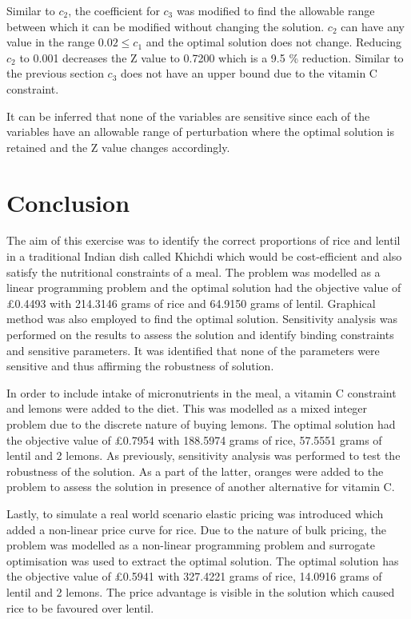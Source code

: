 \documentclass[
]{article}
\begin{document}
\begin{enumerate}
	      Similar to $c_2$, the coefficient for $c_3$ was modified to find the allowable range between which it can be modified without changing the solution.
	      $c_2$ can have any value in the range \(0.02 \le c_1 \) and the optimal solution does not change. Reducing $c_2$ to 0.001 decreases the Z value to 0.7200 which is a 9.5 \% reduction.
	      Similar to the previous section $c_3$ does not have an upper bound due to the vitamin C constraint.
	      	      
	      It can be inferred that none of the variables are sensitive since each of the variables have an allowable range of perturbation where the optimal solution is retained and the Z value changes accordingly.
	      	        
\end{enumerate}


\hypertarget{conclusion}{%
	\section{Conclusion}\label{conclusion}}

The aim of this exercise was to identify the correct proportions of rice and lentil in a traditional Indian dish called Khichdi which would be cost-efficient and also satisfy the nutritional constraints of a meal.
The problem was modelled as a linear programming problem and the optimal solution had the objective value of \pounds 0.4493 with 214.3146 grams of rice and 64.9150 grams of lentil.
Graphical method was also employed to find the optimal solution. Sensitivity analysis was performed on the results to assess the solution and identify binding constraints and sensitive parameters. It was identified that none of the parameters were sensitive and thus affirming the robustness of solution.

In order to include intake of micronutrients in the meal, a vitamin C constraint and lemons were added to the diet. This was modelled as a mixed integer problem due to the discrete nature of buying lemons.
The optimal solution had the objective value of \pounds 0.7954 with 188.5974 grams of rice, 57.5551 grams of lentil and 2 lemons. As previously, sensitivity analysis was performed to test the robustness of the solution.
As a part of the latter, oranges were added to the problem to assess the solution in presence of another alternative for vitamin C. 

Lastly, to simulate a real world scenario elastic pricing was introduced which added a non-linear price curve for rice. Due to the nature of bulk pricing, the problem was modelled as a non-linear programming problem and surrogate optimisation was used to extract the optimal solution.
The optimal solution has the objective value of \pounds 0.5941 with 327.4221 grams of rice, 14.0916 grams of lentil and 2 lemons. The price advantage is visible in the solution which caused rice to be favoured over lentil.
\end{document}
